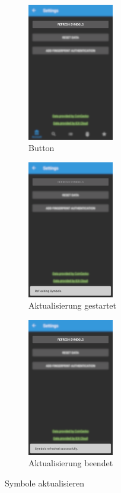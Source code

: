 \documentclass[a4paper]{article}
\begin{document}
\begin{figure}[H]
    \begin{subfigure}{.329\textwidth}
        \centering
        \includegraphics[height=6cm,keepaspectratio]{./images/settings/refresh_symbols_button.png}
        \caption{Button}
        \label{fig:functionality:settings:refreshsymbols:button}
    \end{subfigure}
    \begin{subfigure}{.329\textwidth}
        \centering
        \includegraphics[height=6cm,keepaspectratio]{./images/settings/refresh_symbols_requested.png}
        \caption{Aktualisierung gestartet}
        \label{fig:functionality:settings:refreshsymbols:requested}
    \end{subfigure}
    \begin{subfigure}{.329\textwidth}
        \centering
        \includegraphics[height=6cm,keepaspectratio]{./images/settings/refresh_symbols_done.png}
        \caption{Aktualisierung beendet}
        \label{fig:functionality:settings:refreshsymbols:done}
    \end{subfigure}
    \caption{Symbole aktualisieren}
    \label{fig:functionality:settings:refreshsymbols}
\end{figure}
\end{document}

